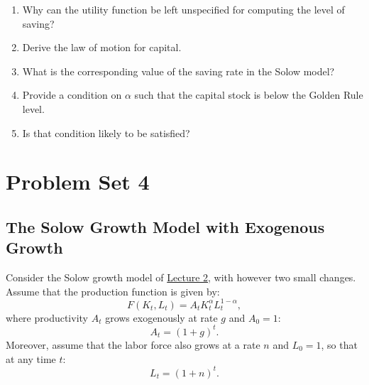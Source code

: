 \documentclass[]{book}
\theoremstyle{definition}
\theoremstyle{definition}
\theoremstyle{definition}
\theoremstyle{remark}
\begin{document}
\begin{enumerate}
\def\labelenumi{\arabic{enumi}.}
\item
  Why can the utility function be left unspecified for computing the
  level of saving?
\item
  Derive the law of motion for capital.
\item
  What is the corresponding value of the saving rate in the Solow model?
\item
  Provide a condition on \(\alpha\) such that the capital stock is below
  the Golden Rule level.
\item
  Is that condition likely to be satisfied?
\end{enumerate}

\hypertarget{pset4}{\chapter{Problem Set 4}\label{pset4}}

\section{The Solow Growth Model with Exogenous
Growth}\label{the-solow-growth-model-with-exogenous-growth}

Consider the Solow growth model of \protect\hyperlink{solow}{Lecture 2},
with however two small changes. Assume that the production function is
given by: \[F(K_t,L_t)=A_t K_t^{\alpha} L_t^{1-\alpha},\] where
productivity \(A_t\) grows exogenously at rate \(g\) and \(A_0=1\):
\[A_t=(1+g)^t.\] Moreover, assume that the labor force also grows at a
rate \(n\) and \(L_0=1\), so that at any time \(t\): \[ L_t = (1+n)^t.\]
\end{document}
